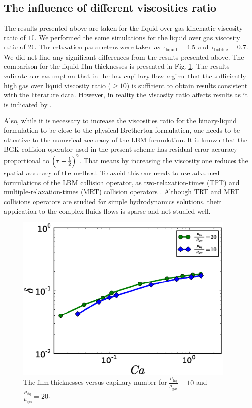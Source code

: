 \documentclass[preprint,12pt]{elsarticle}
\begin{document}
\subsection{The influence of different viscosities ratio}
The results presented above are taken for the liquid over gas kinematic viscosity ratio of $10$.
We performed the same simulations for the liquid over gas viscosity ratio of $20$.
The relaxation parameters were taken as $\tau_{\mathrm{liquid}}=4.5$ and $\tau_{\mathrm{bubble}}=0.7$. We
did not find any significant differences from the results presented above. The
comparison for the liquid film thicknesses is presented in Fig.
\ref{fig:capillary:viscous}. The results validate our assumption that in
the low capillary flow regime that the sufficiently high gas over liquid viscosity ratio ($\geq 10$) is sufficient to obtain results
consistent with the literature data. 
{\color{red} However, in reality the viscosity ratio affects results as it
is indicated by \citet{shikazono-square}.}

{\color{red} Also, while it is necessary to increase the viscosities ratio for the binary-liquid
formulation to be close to the physical Bretherton formulation, one needs to be attentive to the
numerical accuracy of the LBM formulation. It is known \cite{ginzburg-trt-simple-hydro} that the
BGK collision operator used in the present scheme has residual error accuracy proportional
to $\Bigl(\tau-\frac{1}{2}\Bigr)^2$. That means by increasing the viscosity one reduces the spatial
accuracy of the method. To avoid this one needs to use advanced formulations of the LBM collision
operator, as two-relaxation-times (TRT) and multiple-relaxation-times (MRT) collision operators
\cite{ginzburg-main}. Although TRT and MRT collisions operators are studied for simple
hydrodynamics solutions, their application to the complex fluids flows is sparse and not studied
well.
}
\begin{figure}
\includegraphics[width=0.97\textwidth]{Figures/Capillary_Viscous/capillaries_viscous.eps}
\caption{The film thicknesses versus capillary number for
$\frac{\mu_{\mathrm{liq}}}{\mu_{\mathrm{gas}}}=10$ and $\frac{\mu_{\mathrm{liq}}}{\mu_{\mathrm{gas}}}=20$. \label{fig:capillary:viscous}}
\end{figure}
\end{document}
